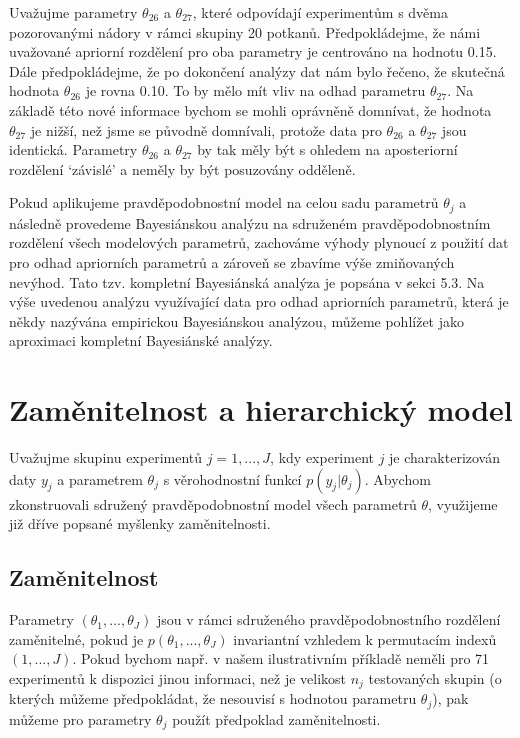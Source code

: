 Uvažujme parametry $\theta_{26}$ a $\theta_{27}$, které odpovídají experimentům s dvěma pozorovanými nádory v rámci skupiny 20 potkanů. Předpokládejme, že námi uvažované apriorní rozdělení pro oba parametry je centrováno na hodnotu 0.15. Dále předpokládejme, že po dokončení analýzy dat nám bylo řečeno, že skutečná hodnota $\theta_{26}$ je rovna 0.10. To by mělo mít vliv na odhad parametru $\theta_{27}$. Na základě této nové informace bychom se mohli oprávněně domnívat, že hodnota $\theta_{27}$ je nižší, než jsme se původně domnívali, protože data pro $\theta_{26}$ a $\theta_{27}$ jsou identická. Parametry $\theta_{26}$ a $\theta_{27}$ by tak měly být s ohledem na aposteriorní rozdělení `závislé' a neměly by být posuzovány odděleně.

Pokud aplikujeme pravděpodobnostní model na celou sadu parametrů $\theta_j$ a následně provedeme Bayesiánskou analýzu na sdruženém pravděpodobnostním rozdělení všech modelových parametrů, zachováme výhody plynoucí z použití dat pro odhad apriorních parametrů a zároveň se zbavíme výše zmiňovaných nevýhod. Tato tzv. kompletní Bayesiánská analýza je popsána v sekci 5.3. Na výše uvedenou analýzu využívající data pro odhad apriorních parametrů, která je někdy nazývána empirickou Bayesiánskou analýzou, můžeme pohlížet jako aproximaci kompletní Bayesiánské analýzy.

\section{Zaměnitelnost a hierarchický model}

Uvažujme skupinu experimentů $j = 1, ..., J$, kdy experiment $j$ je charakterizován daty $y_j$ a parametrem $\theta_j$ s věrohodnostní funkcí $p(y_j|\theta_j)$. Abychom zkonstruovali sdružený pravděpodobnostní model všech parametrů $\theta$, využijeme již dříve popsané myšlenky zaměnitelnosti.

\subsection{Zaměnitelnost}

Parametry $(\theta_1, ..., \theta_J)$ jsou v rámci sdruženého pravděpodobnostního rozdělení zaměnitelné, pokud je $p(\theta_1, ..., \theta_J)$ invariantní vzhledem k permutacím indexů $(1, ..., J)$. Pokud bychom např. v našem ilustrativním příkladě neměli pro 71 experimentů k dispozici jinou informaci, než je velikost $n_j$ testovaných skupin (o kterých můžeme předpokládat, že nesouvisí s hodnotou parametru $\theta_j$), pak můžeme pro parametry $\theta_j$ použít předpoklad zaměnitelnosti.

